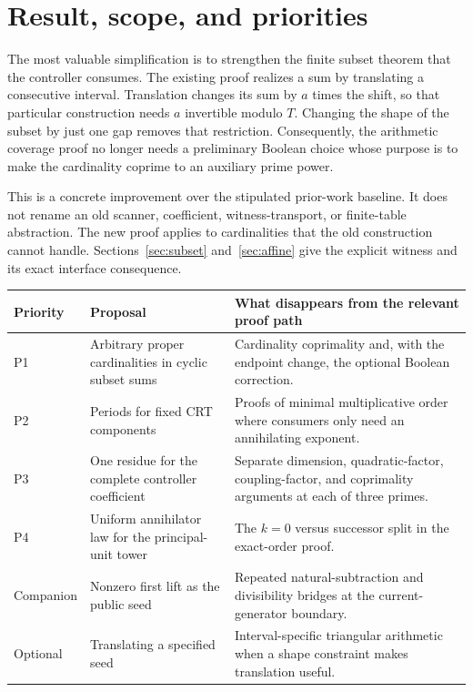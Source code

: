 \documentclass[11pt,letterpaper]{article}
\begin{document}
\section{Result, scope, and priorities}

The most valuable simplification is to strengthen the finite subset theorem
that the controller consumes. The existing proof realizes a sum by translating
a consecutive interval. Translation changes its sum by $a$ times the shift,
so that particular construction needs $a$ invertible modulo $T$. Changing the
shape of the subset by just one gap removes that restriction. Consequently,
the arithmetic coverage proof no longer needs a preliminary Boolean choice
whose purpose is to make the cardinality coprime to an auxiliary prime power.

This is a concrete improvement over the stipulated prior-work baseline.
It does not rename an old scanner, coefficient, witness-transport, or
finite-table abstraction. The new proof applies to cardinalities that the
old construction cannot handle. Sections~\ref{sec:subset} and~\ref{sec:affine}
give the explicit witness and its exact interface consequence.

\begin{longtable}{@{}>{\raggedright\arraybackslash}p{}>{\raggedright\arraybackslash}p{}>{\raggedright\arraybackslash}p{}@{}}
\toprule
Priority & Proposal & What disappears from the relevant proof path \\
\midrule
\endhead
P1 & Arbitrary proper cardinalities in cyclic subset sums & Cardinality coprimality and, with the endpoint change, the optional Boolean correction. \\
P2 & Periods for fixed CRT components & Proofs of minimal multiplicative order where consumers only need an annihilating exponent. \\
P3 & One residue for the complete controller coefficient & Separate dimension, quadratic-factor, coupling-factor, and coprimality arguments at each of three primes. \\
P4 & Uniform annihilator law for the principal-unit tower & The $k=0$ versus successor split in the exact-order proof. \\
Companion & Nonzero first lift as the public seed & Repeated natural-subtraction and divisibility bridges at the current-generator boundary. \\
Optional & Translating a specified seed & Interval-specific triangular arithmetic when a shape constraint makes translation useful. \\
\bottomrule
\end{longtable}
\end{document}
